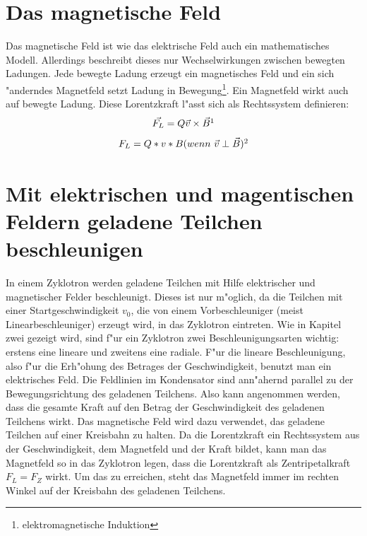 \documentclass[14pt, a4paper]{report}
\begin{document}
\section{Das magnetische Feld}
Das magnetische Feld ist wie das elektrische Feld auch ein mathematisches Modell.
Allerdings beschreibt dieses nur Wechselwirkungen zwischen bewegten Ladungen. Jede
bewegte Ladung erzeugt ein magnetisches Feld und ein sich "anderndes Magnetfeld 
setzt Ladung in Bewegung\footnote{elektromagnetische Induktion}.
Ein Magnetfeld wirkt auch auf bewegte Ladung. Diese Lorentzkraft l"asst sich als
Rechtssystem definieren:
\newpage
\begin{equation} \label{B-Feld-Gleichungen}
 \vec{F_L} = Q\vec{v} \times \vec{B} \footnotemark
\end{equation}
\begin{equation}
 F_L  = Q * v * B (wenn ~ \vec{v} \perp \vec{B}) \footnotemark
\end{equation}

 
\section{Mit elektrischen und magentischen Feldern geladene Teilchen beschleunigen}
In einem Zyklotron werden geladene Teilchen mit Hilfe elektrischer und magnetischer 
Felder beschleunigt. Dieses ist nur m"oglich, da die Teilchen mit einer
Startgeschwindigkeit $v_0$, die von einem Vorbeschleuniger (meist 
Linearbeschleuniger) erzeugt wird, in das Zyklotron eintreten. Wie in Kapitel zwei
gezeigt wird,
sind f"ur ein Zyklotron zwei Beschleunigungsarten wichtig: erstens eine lineare und 
zweitens eine radiale. F"ur die lineare Beschleunigung, also f"ur die Erh"ohung des 
Betrages der Geschwindigkeit, benutzt man ein elektrisches Feld. Die Feldlinien im 
Kondensator sind ann"ahernd parallel zu der Bewegungsrichtung des geladenen Teilchens. 
Also kann angenommen werden, dass die gesamte Kraft auf den Betrag der Geschwindigkeit 
des geladenen Teilchens wirkt. Das magnetische Feld wird dazu verwendet, das geladene
Teilchen auf einer Kreisbahn zu halten. Da die Lorentzkraft ein Rechtssystem aus der
Geschwindigkeit, dem Magnetfeld und der Kraft bildet, kann man das Magnetfeld so
in das Zyklotron legen, dass die Lorentzkraft als Zentripetalkraft $F_L = F_Z$ wirkt.
Um das zu erreichen, steht das Magnetfeld immer im rechten Winkel auf der Kreisbahn
des geladenen Teilchens.
\end{document}
